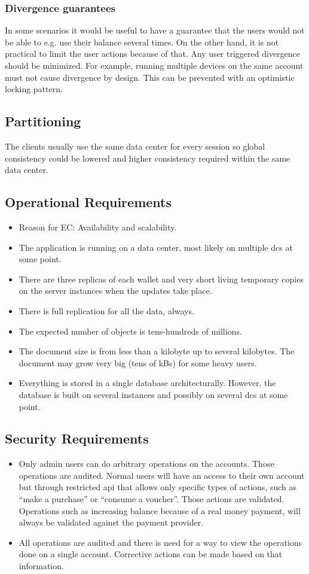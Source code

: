\documentclass[11pt,a4paper]{report}
\begin{document}
\subsubsection{Divergence guarantees}
In some scenarios it would be useful to have a guarantee that the users would not be able to e.g. use their balance several times. On the other hand, it is not practical to limit the user actions because of that.
Any user triggered divergence should be minimized. For example, running multiple devices on the same account must not cause divergence by design. This can be prevented with an optimistic locking pattern.

\subsection{Partitioning}
The clients usually use the same data center for every session so global consistency could be lowered and higher consistency required within the same data center.

\subsection{Operational Requirements}
\begin{itemize}
\item Reason for EC: Availability and scalability.
\item The application is running on a data center, most likely on multiple \glspl{dc} at some point.
\item There are three replicas of each wallet and very short living temporary copies on the server instances when the updates take place.
\item There is full replication for all the data, always.
\item The expected number of objects is tens-hundreds of millions.
\item The document size is from less than a kilobyte up to several kilobytes. The document may grow very big (tens of kBs) for some heavy users.
\item Everything is stored in a single database architecturally. However, the database is built on several instances and possibly on several \glspl{dc} at some point.
\end{itemize}
\subsection{Security Requirements}
\begin{itemize}
\item Only admin users can do arbitrary operations on the accounts. Those operations are audited. Normal users will have an access to their own account but through restricted \gls{api} that allows only specific types of actions, such as ``make a purchase'' or ``consume a voucher''. Those actions are validated. Operations such as increasing balance because of a real money payment, will always be validated against the payment provider.
\item All operations are audited and there is need for a way to view the operations done on a single account. Corrective actions can be made based on that information.
\end{itemize}
\end{document}
